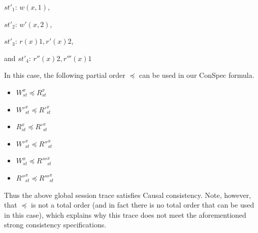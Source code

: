 \documentclass[conference]{IEEEtran}
\begin{document}
	$\mathit{st}'_1$: $w(x,1)$,
	
	$\mathit{st}'_2$: $w'(x,2)$,
	
	$\mathit{st}'_3$: $r(x){1}, r'(x){2}$,
	
	and  $\mathit{st}'_4$: $r''(x){2}, r'''(x){1}$
	
	In this case, the following partial order  $\preccurlyeq$ can be used in our ConSpec formula.
	
	\begin{itemize}
		
		\item $W^x_{\mathit{st}}   \preccurlyeq R^x_{\mathit{st}} $  
		\item $W'^x_{\mathit{st}}  \preccurlyeq R'^x_{\mathit{st}} $
		\item $R^x_{\mathit{st}} \preccurlyeq R'^x_{\mathit{st}} $
		
		\item $W'^x_{\mathit{st}}   \preccurlyeq R''^x_{\mathit{st}} $  
		\item $W^x_{\mathit{st}}  \preccurlyeq R'''^x_{\mathit{st}} $
		\item $R''^x_{\mathit{st}} \preccurlyeq R'''^x_{\mathit{st}} $
		
		
		
	\end{itemize}
	
	\noindent Thus the above  global session trace satisfies Causal consistency. Note, however, that $\preccurlyeq$ is not a total order (and in fact there is no total order that can be used in this case), which explains why this trace does not meet the aforementioned strong consistency specifications.
	
\end{document}
